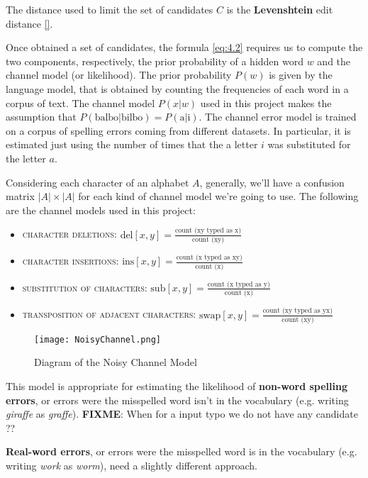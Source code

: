 The distance used to limit the set of candidates $C$ is the \textbf{Levenshtein} edit distance \ref{}.	

Once obtained a set of candidates, the formula \ref{eq:4.2} requires us to compute the two components, 
respectively, the prior probability of a hidden word $w$ and the channel model (or likelihood).
The prior probability $P(w)$ is given by the language model, that is obtained by counting the frequencies of 
each word in a corpus of text.  
The channel model $P(x|w)$ used in this project makes the assumption that $P(\mbox{balbo}|\mbox{bilbo}) = 
P(\mbox{a}|\mbox{i})$. The channel error model is trained on a corpus of spelling errors coming from different 
datasets. In particular, it is estimated just using the number of times that the a letter $i$ was substituted for the 
letter $a$. 

Considering each character of an alphabet $A$, generally, we'll have a confusion matrix $|A|\times|A|$ for each 
kind of channel model we're going to use. The following are the channel models used in this project:
\begin{itemize}
	\item \textsc{character deletions}: $\mbox{del}[x, y] = \frac{\mbox{count (xy  typed as x)}} 
	{\mbox{count (xy)}}$
	\item \textsc{character insertions}: $\mbox{ins}[x, y] = \frac{\mbox{count (x  typed as xy)}} 
	{\mbox{count (x)}}$
	\item \textsc{substitution of characters}: $\mbox{sub}[x, y] = \frac{\mbox{count (x  typed as y)}} 
	{\mbox{count (x)}}$
	\item \textsc{transposition of adjacent characters}: $\mbox{swap}[x, y] = \frac{\mbox{count (xy  typed as 
	yx)}} 
	{\mbox{count (xy)}}$
\end{itemize}

\begin{figure}[H]
	\centering
	\texttt{[image: NoisyChannel.png]}
	\caption{Diagram of the Noisy Channel Model}
	\label{fig:noisychannel}
\end{figure}


This model is appropriate for estimating the likelihood of \textbf{non-word spelling errors}, or errors were the 
misspelled word isn't in the vocabulary (e.g. writing \textsl{giraffe} as \textsl{graffe}).
\textbf{FIXME}: When for a input typo we do not have any candidate ?? 

\textbf{Real-word errors}, or errors were the misspelled word is in the vocabulary (e.g. writing \textsl{work}  as  
\textsl{worm}), need a slightly different approach.

